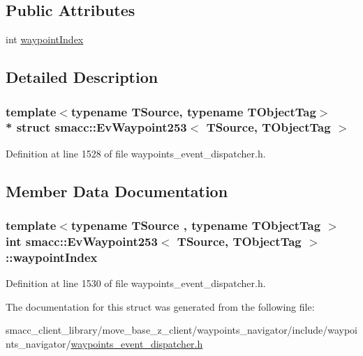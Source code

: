 \subsection*{Public Attributes}
\begin{DoxyCompactItemize}
\item 
int \hyperlink{structsmacc_1_1EvWaypoint253_aa9a96eac293ce8a46935a7a921fb46ea}{waypoint\+Index}
\end{DoxyCompactItemize}


\subsection{Detailed Description}
\subsubsection*{template$<$typename T\+Source, typename T\+Object\+Tag$>$\\*
struct smacc\+::\+Ev\+Waypoint253$<$ T\+Source, T\+Object\+Tag $>$}



Definition at line 1528 of file waypoints\+\_\+event\+\_\+dispatcher.\+h.



\subsection{Member Data Documentation}
\subsubsection[{\texorpdfstring{waypoint\+Index}{waypointIndex}}]{\setlength{\rightskip}{0pt plus 5cm}template$<$typename T\+Source , typename T\+Object\+Tag $>$ int {\bf smacc\+::\+Ev\+Waypoint253}$<$ T\+Source, T\+Object\+Tag $>$\+::waypoint\+Index}\hypertarget{structsmacc_1_1EvWaypoint253_aa9a96eac293ce8a46935a7a921fb46ea}{}\label{structsmacc_1_1EvWaypoint253_aa9a96eac293ce8a46935a7a921fb46ea}


Definition at line 1530 of file waypoints\+\_\+event\+\_\+dispatcher.\+h.



The documentation for this struct was generated from the following file\+:\begin{DoxyCompactItemize}
\item 
smacc\+\_\+client\+\_\+library/move\+\_\+base\+\_\+z\+\_\+client/waypoints\+\_\+navigator/include/waypoints\+\_\+navigator/\hyperlink{waypoints__event__dispatcher_8h}{waypoints\+\_\+event\+\_\+dispatcher.\+h}\end{DoxyCompactItemize}
